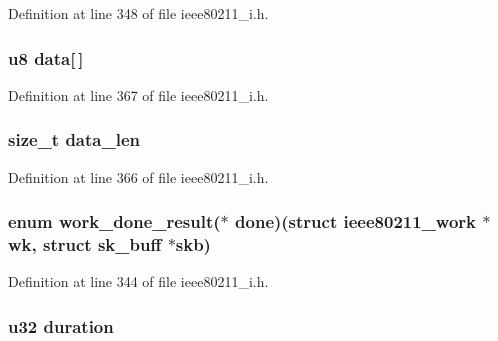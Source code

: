 Definition at line 348 of file ieee80211\-\_\-i.\-h.

\hypertarget{structieee80211__work_a6dc95797421616e7833cb107fee9d17f}{
\subsubsection[{data}]{\setlength{\rightskip}{0pt plus 5cm}u8 data\mbox{[}$\,$\mbox{]}}}\label{structieee80211__work_a6dc95797421616e7833cb107fee9d17f}


Definition at line 367 of file ieee80211\-\_\-i.\-h.

\hypertarget{structieee80211__work_ace1c2e33b74df8973a7d9a19c935af80}{
\subsubsection[{data\-\_\-len}]{\setlength{\rightskip}{0pt plus 5cm}size\-\_\-t data\-\_\-len}}\label{structieee80211__work_ace1c2e33b74df8973a7d9a19c935af80}


Definition at line 366 of file ieee80211\-\_\-i.\-h.

\hypertarget{structieee80211__work_a8cafc3e050dcbac4c13d42bbed5da146}{
\subsubsection[{done}]{\setlength{\rightskip}{0pt plus 5cm}enum {\bf work\-\_\-done\-\_\-result}($\ast$ done)(struct {\bf ieee80211\-\_\-work} $\ast$wk, struct sk\-\_\-buff $\ast$skb)}}\label{structieee80211__work_a8cafc3e050dcbac4c13d42bbed5da146}


Definition at line 344 of file ieee80211\-\_\-i.\-h.

\hypertarget{structieee80211__work_ae0565e8bbc0bf97f0747e1e4757fc5a0}{
\subsubsection[{duration}]{\setlength{\rightskip}{0pt plus 5cm}u32 duration}}\label{structieee80211__work_ae0565e8bbc0bf97f0747e1e4757fc5a0}


